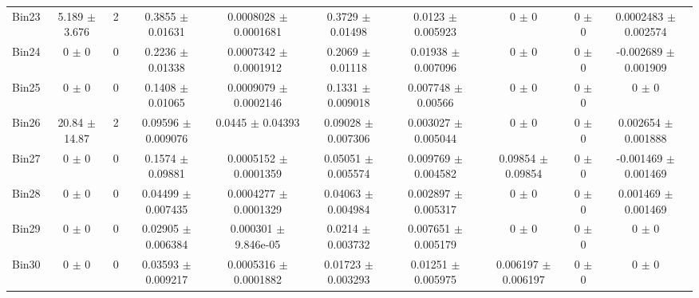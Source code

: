 \begin{tabular}{@{\extracolsep{4pt}}lccccccccc@{}}
     Bin23 & 5.189 $\pm$ 3.676 & 2 & 0.3855 $\pm$ 0.01631 & 0.0008028 $\pm$ 0.0001681 & 0.3729 $\pm$ 0.01498 & 0.0123 $\pm$ 0.005923 & 0 $\pm$ 0 & 0 $\pm$ 0 & 0.0002483 $\pm$ 0.002574 \\ 
     Bin24 & 0 $\pm$ 0 & 0 & 0.2236 $\pm$ 0.01338 & 0.0007342 $\pm$ 0.0001912 & 0.2069 $\pm$ 0.01118 & 0.01938 $\pm$ 0.007096 & 0 $\pm$ 0 & 0 $\pm$ 0 & -0.002689 $\pm$ 0.001909 \\ 
     Bin25 & 0 $\pm$ 0 & 0 & 0.1408 $\pm$ 0.01065 & 0.0009079 $\pm$ 0.0002146 & 0.1331 $\pm$ 0.009018 & 0.007748 $\pm$ 0.00566 & 0 $\pm$ 0 & 0 $\pm$ 0 & 0 $\pm$ 0 \\ 
     Bin26 & 20.84 $\pm$ 14.87 & 2 & 0.09596 $\pm$ 0.009076 & 0.0445 $\pm$ 0.04393 & 0.09028 $\pm$ 0.007306 & 0.003027 $\pm$ 0.005044 & 0 $\pm$ 0 & 0 $\pm$ 0 & 0.002654 $\pm$ 0.001888 \\ 
     Bin27 & 0 $\pm$ 0 & 0 & 0.1574 $\pm$ 0.09881 & 0.0005152 $\pm$ 0.0001359 & 0.05051 $\pm$ 0.005574 & 0.009769 $\pm$ 0.004582 & 0.09854 $\pm$ 0.09854 & 0 $\pm$ 0 & -0.001469 $\pm$ 0.001469 \\ 
     Bin28 & 0 $\pm$ 0 & 0 & 0.04499 $\pm$ 0.007435 & 0.0004277 $\pm$ 0.0001329 & 0.04063 $\pm$ 0.004984 & 0.002897 $\pm$ 0.005317 & 0 $\pm$ 0 & 0 $\pm$ 0 & 0.001469 $\pm$ 0.001469 \\ 
     Bin29 & 0 $\pm$ 0 & 0 & 0.02905 $\pm$ 0.006384 & 0.000301 $\pm$ 9.846e-05 & 0.0214 $\pm$ 0.003732 & 0.007651 $\pm$ 0.005179 & 0 $\pm$ 0 & 0 $\pm$ 0 & 0 $\pm$ 0 \\ 
     Bin30 & 0 $\pm$ 0 & 0 & 0.03593 $\pm$ 0.009217 & 0.0005316 $\pm$ 0.0001882 & 0.01723 $\pm$ 0.003293 & 0.01251 $\pm$ 0.005975 & 0.006197 $\pm$ 0.006197 & 0 $\pm$ 0 & 0 $\pm$ 0 \\ 
\hline\hline
  \end{tabular}
